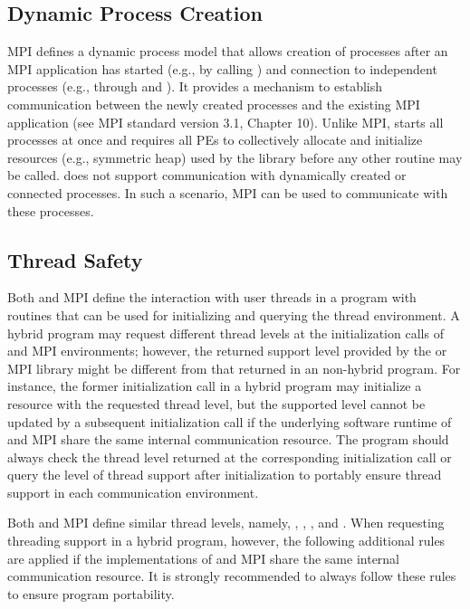 \subsection{Dynamic Process Creation}
\label{subsec:interoperability:mpmd}

\ac{MPI} defines a dynamic process model that allows creation of processes after
an \ac{MPI} application has started (e.g., by calling ) and
connection to independent processes (e.g., through 
and ).
It provides a mechanism to establish communication
between the newly created processes and the existing \ac{MPI} application (see
\ac{MPI} standard version 3.1, Chapter 10).
Unlike \ac{MPI}, \openshmem starts all processes at once and requires all \acp{PE} to
collectively allocate and initialize resources (e.g., symmetric heap) used by
the \openshmem library before any other \openshmem routine may
be called. \openshmem does not support communication with dynamically created
or connected processes. In such a scenario, \ac{MPI} can be used to communicate
with these processes.


\subsection{Thread Safety}
\label{subsec:interoperability:thread}
Both \openshmem and \ac{MPI} define the interaction with user threads in a program
with routines that can be used for initializing and querying the thread
environment. A hybrid program may request different thread levels
at the initialization calls of \openshmem and \ac{MPI} environments; however, the
returned support level provided by the \openshmem or \ac{MPI} library might be different
from that returned in an non-hybrid program. For instance, the former
initialization call in a hybrid program may initialize a resource with the
requested thread level, but the supported level cannot be updated by a subsequent
initialization call if the underlying software runtime of \openshmem and \ac{MPI}
share the same internal communication resource.
The program should always check the  thread level returned
at the corresponding initialization call or query the level of thread support
after initialization to portably ensure thread support in each communication
environment.

Both \openshmem and \ac{MPI} define similar thread levels, namely, ,
, , and .
When requesting threading support in a hybrid program, however,
the following additional rules are applied if the implementations of \openshmem
and \ac{MPI} share the same internal communication resource.
It is strongly recommended to always follow these rules to ensure program
portability.

